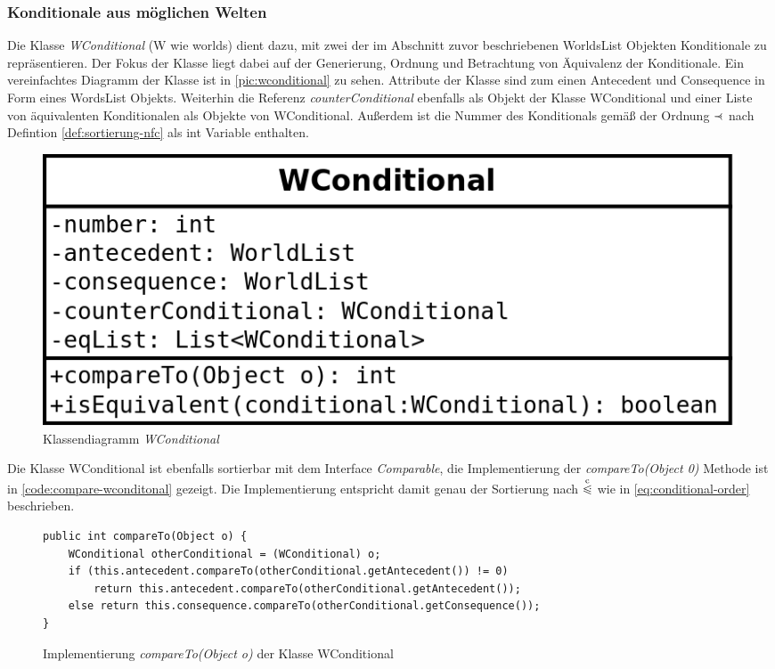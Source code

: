 \documentclass[12pt,a4paper]{article}
\newcommand\dotll{\mathrel{%
    \mathchoice{\QEQQ}{\QEQQ}{\QEQQ}{\QEQQ}%
}}
\def\QEQQ{{%
    \setbox0\hbox{$\leqslant$}%
    \rlap{\hbox to \wd0{\hss \raisebox {1pt}{$\ \cdot$\hss}}}\box0
}}
\newcommand\rdotl{\mathrel{%
    \mathchoice{\RQEQ}{\RQEQ}{\RQEQ}{\RQEQ}%
}}
\def\RQEQ{{%
    \setbox0\hbox{$\prec$}%
    \rlap{\hbox to \wd0{\hss \raisebox {0.01pt}{$\ \cdot$\hss}}}\box0
}}
\begin{document}
\subsubsection{Konditionale aus möglichen Welten} 



Die Klasse \textit{WConditional} (W wie worlds) dient dazu, mit zwei der im Abschnitt zuvor beschriebenen WorldsList Objekten Konditionale zu repräsentieren. Der Fokus der Klasse liegt dabei auf der Generierung, Ordnung und Betrachtung von Äquivalenz der Konditionale. Ein vereinfachtes Diagramm der Klasse ist in \autoref{pic:wconditional} zu sehen. Attribute der Klasse sind zum einen Antecedent und Consequence in Form eines WordsList Objekts. Weiterhin die Referenz \textit{counterConditional} ebenfalls als Objekt der Klasse WConditional und einer Liste von äquivalenten Konditionalen als Objekte von WConditional. Außerdem ist die Nummer des Konditionals gemäß der Ordnung $\rdotl$ nach Defintion \ref{def:sortierung-nfc} als int Variable enthalten.



\begin{figure}
\includegraphics[width=0.55\linewidth]{bilder/wconditional.png}
\caption{Klassendiagramm \textit{WConditional}}
\label{pic:wconditional}
\end{figure}






Die Klasse WConditional ist ebenfalls sortierbar mit dem Interface \textit{Comparable}, die Implementierung der \textit{compareTo(Object 0)} Methode ist in \autoref{code:compare-wconditonal} gezeigt. Die Implementierung entspricht damit genau der Sortierung nach $\overset{\mathrm{c}}{\dotll}$ wie in \autoref{eq:conditional-order} beschrieben.


\begin{figure}
\begin{lstlisting}
public int compareTo(Object o) {
    WConditional otherConditional = (WConditional) o;
    if (this.antecedent.compareTo(otherConditional.getAntecedent()) != 0)
        return this.antecedent.compareTo(otherConditional.getAntecedent());
    else return this.consequence.compareTo(otherConditional.getConsequence());
}
\end{lstlisting}
\caption{Implementierung \textit{compareTo(Object o)} der Klasse WConditional}
\label{code:compare-wconditonal}
\end{figure}
\end{document}
